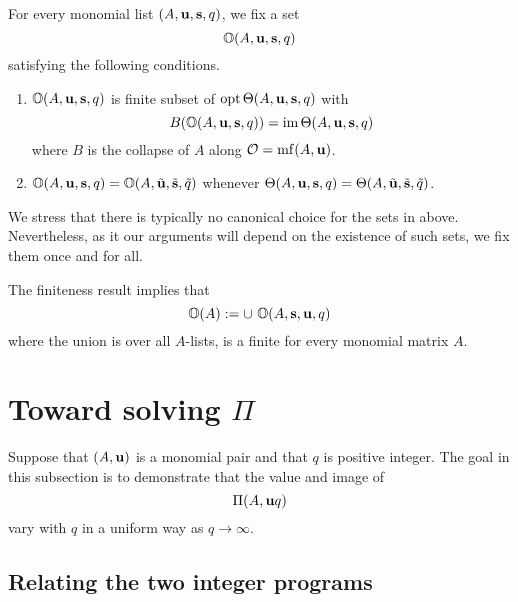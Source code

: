 \documentclass[11pt]{amsart}
\begin{document}
\begin{definition}
\label{orep: D}
  For every monomial list $(A, \mathbf{u}, \mathbf{s}, q)$, we fix a set 
\[ \mathbb{O}(A, \mathbf{u}, \mathbf{s}, q) \] satisfying the following conditions.
\begin{enumerate}
\item  $\mathbb{O}(A, \mathbf{u}, \mathbf{s}, q)$ is finite subset of $\operatorname{opt} \Theta(A, \mathbf{u}, \mathbf{s}, q)$ with \[ B( \mathbb{O}(A, \mathbf{u}, \mathbf{s}, q) ) = \operatorname{im} \Theta(A, \mathbf{u}, \mathbf{s}, q) \]
where $B$ is the collapse of $A$ along $\mathcal{O} = \operatorname{mf}(A, \mathbf{u})$.
 
\item $\mathbb{O}(A, \mathbf{u}, \mathbf{s}, q) = \mathbb{O}(A, \tilde{\mathbf{u}}, \tilde{\mathbf{s}}, \tilde{q})$ whenever  
$\Theta(A, \mathbf{u}, \mathbf{s}, q) = \Theta(A, \tilde{\mathbf{u}}, \tilde{\mathbf{s}}, \tilde{q})$.
\end{enumerate} 
\end{definition}

\begin{remark}
We stress that there is typically no canonical choice for the sets in  above.  Nevertheless, as it our arguments will depend on the existence of such sets, we fix them once and for all.
\end{remark}

\begin{remark}
\label{finiteness of optimal reps: R}
The finiteness result  implies that \[ \mathbb{O}(A) := \cup  \ \mathbb{O}( A, \mathbf{s}, \mathbf{u}, q ) \] where the union is over all $A$-lists, is a finite for every monomial matrix $A$.
\end{remark}

\section{Toward solving $\Pi$}
\label{solving: S}

Suppose that $(A, \mathbf{u})$ is a monomial pair and that $q$ is positive integer. The goal in this subsection is to demonstrate that the value and image of \[ \Pi(A, \mathbf{u}q) \] vary with $q$ in a uniform way as $q \to \infty$.

\subsection{Relating the two integer programs}
\label{relating-programs: ss}
\end{document}
